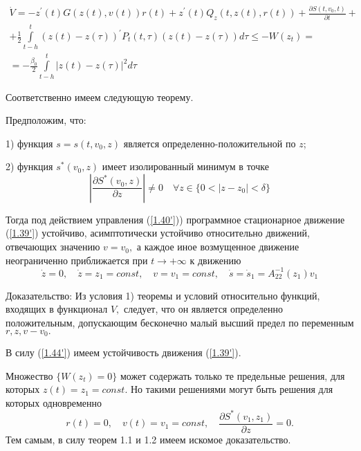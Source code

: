 \begin{equation} \label{1.44'}
\begin{array}{c}
\displaystyle \dot V = - z^{'} (t) G(z(t), v(t)) r(t) + z^{'} (t) Q_z (t, z(t), r(t)) + \frac{\partial S(t, v_0, t)}{\partial t} +\\
\displaystyle + \frac12 \displaystyle\int\limits_{t - h}^{t} (z(t) - z(\tau))^{'} P_t(t, \tau) (z(t) - z(\tau)) d \tau \le - W(z_t) =\\
\displaystyle = -\frac{\beta_0}{2} \displaystyle\int\limits_{t - h}^{t} \left| z(t) - z(\tau) \right|^2 d \tau
\end{array}
\end{equation}

Соответственно имеем следующую теорему.

\begin{theorem}\label{t-1.10}
Предположим, что:

1) функция $s = s(t, v_0, z)$ является определенно-положительной по $z$;

2) функция $s^{*} (v_0, z)$ имеет изолированный минимум в точке 
$$\left| \frac{\partial S^{*} (v_0, z)}{\partial z} \right| \ne 0 \quad \forall z \in \lbrace 0 < \left| z - z_0 \right| < \delta \rbrace$$

Тогда под действием управления (\ref{1.40'})) программное стационарное движение (\ref{1.39'}) устойчиво, асимптотически устойчиво относительно движений, отвечающих значению $v = v_0,$ а каждое иное возмущенное движение неограниченно приближается при $t \to + \infty$ к движению 
$$\dot z = 0, \quad \dot z = z_1 = const, \quad v = v_1 = const, \quad \dot s = \dot s_1 = A_{22}^{-1} (z_1) v_1$$
\end{theorem}

Доказательство:
Из условия 1) теоремы и условий относительно функций, входящих в функционал $V,$ следует, что он является определенно положительным, допускающим бесконечно малый высший предел по переменным $r, z, v - v_0.$

В силу (\ref{1.44'}) имеем устойчивость движения (\ref{1.39'}).

Множество $\lbrace W(z_t) = 0 \rbrace$ может содержать только те предельные решения, для которых $z(t) = z_1 = const.$ Но такими решениями могут быть решения для которых одновременно 
$$r(t) = 0, \quad v(t) = v_1 = const, \quad \frac{\partial S^{*} (v_1, z_1)}{\partial z} = 0.$$
Тем самым, в силу теорем 1.1 и 1.2 имеем искомое доказательство. 